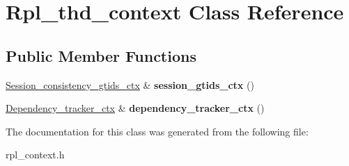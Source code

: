 \hypertarget{classRpl__thd__context}{}\section{Rpl\+\_\+thd\+\_\+context Class Reference}
\label{classRpl__thd__context}
\subsection*{Public Member Functions}
\begin{DoxyCompactItemize}
\item 
\mbox{\label{classRpl__thd__context_a1527faab63d4b342fab8fb7548c39330}} 
\mbox{\hyperlink{classSession__consistency__gtids__ctx}{Session\+\_\+consistency\+\_\+gtids\+\_\+ctx}} \& {\bfseries session\+\_\+gtids\+\_\+ctx} ()
\item 
\mbox{\label{classRpl__thd__context_a6b6d2b9ac52ea5f5a025c5b243354569}} 
\mbox{\hyperlink{classDependency__tracker__ctx}{Dependency\+\_\+tracker\+\_\+ctx}} \& {\bfseries dependency\+\_\+tracker\+\_\+ctx} ()
\end{DoxyCompactItemize}


The documentation for this class was generated from the following file\+:\begin{DoxyCompactItemize}
\item 
rpl\+\_\+context.\+h\end{DoxyCompactItemize}
